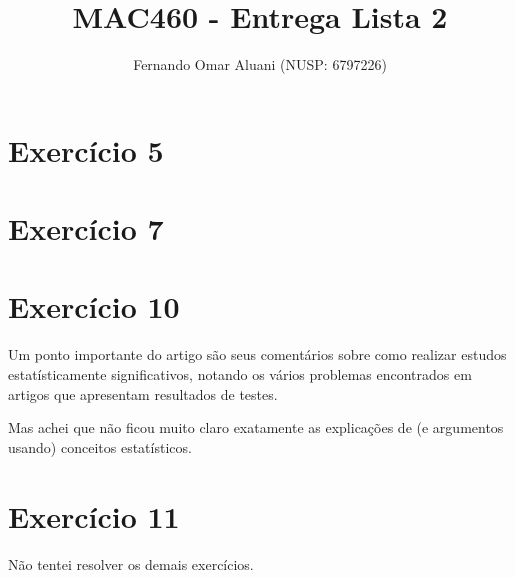 \documentclass[a4paper,11pt]{article}
\title{MAC460 - Entrega Lista 2}
\author{Fernando Omar Aluani (NUSP: 6797226)}
\begin{document}
\maketitle

\section{Exercício 5}

\section{Exercício 7}

\section{Exercício 10}

Um ponto importante do artigo são seus comentários sobre como realizar estudos estatísticamente significativos,
notando os vários problemas encontrados em artigos que apresentam resultados de testes.

Mas achei que não ficou muito claro exatamente as explicações de (e argumentos usando) conceitos estatísticos. 


\section{Exercício 11}

Não tentei resolver os demais exercícios.
\end{document}
